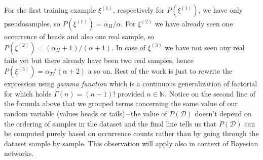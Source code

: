 \documentclass[english,cover]{fitthesis} %
\newcommand{\term}[1]{\emph{#1}}           %
\begin{document}
For the first training example $\xi^{(1)}$, respectively for $P(\xi^{(1)})$, we have only pseudosamples, so $P(\xi^{(1)}) = \alpha_H / \alpha$. For $\xi^{(2)}$ we have already seen one occurrence of heads and also one real sample, so $P(\xi^{(2)}) = (\alpha_H + 1) / (\alpha + 1)$. In case of $\xi^{(3)}$ we have not seen any real tails yet but there already have been two real samples, hence $P(\xi^{(3)}) = \alpha_T / (\alpha + 2)$ a so on. Rest of the work is just to rewrite the expression using \term{gamma function} which is a continuous generalization of factorial for which holds $\Gamma(n) = (n-1)!$ provided $n \in \mathbb{N}$. Notice on the second line of the formula above that we grouped terms concerning the same value of our random variable (values heads or tails)\,--\,the value of $P(\mathcal{D})$ doesn't depend on the ordering of samples in the dataset and the final line tells us that $P(\mathcal{D})$ can be computed purely based on occurrence counts rather than by going through the dataset sample by sample. This observation will apply also in context of Bayesian networks.
\end{document}

